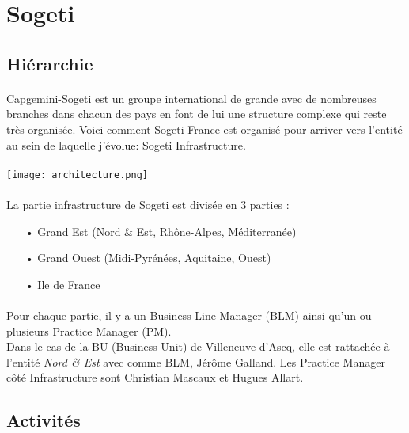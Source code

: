 \documentclass[a4paper,12pt]{report}
\begin{document}
\newpage
\section{Sogeti}
	\subsection{Hiérarchie}
	\paragraph{}
	Capgemini-Sogeti est un groupe international de grande avec de
nombreuses branches dans chacun des pays en font de lui une structure complexe qui reste très organisée. Voici comment Sogeti France est organisé pour arriver vers l'entité au sein de laquelle j'évolue: Sogeti Infrastructure.
	\paragraph{}
	\texttt{[image: architecture.png]}

	\paragraph{}
	La partie infrastructure de Sogeti est divisée en 3 parties :
	\begin{itemize}
		\item[•] Grand Est (Nord \& Est, Rhône-Alpes, Méditerranée)
		\item[•] Grand Ouest (Midi-Pyrénées, Aquitaine, Ouest)
		\item[•] Ile de France
	\end{itemize}	
	\paragraph{}
	Pour chaque partie, il y a un Business Line Manager (BLM) ainsi qu'un ou plusieurs Practice Manager (PM).\\
	Dans le cas de la BU (Business Unit) de Villeneuve d'Ascq, elle est rattachée à l'entité \textit{Nord \& Est} avec comme BLM, Jérôme Galland. Les Practice Manager côté Infrastructure sont Christian Mascaux et Hugues Allart.

	\subsection{Activités}
\end{document}
